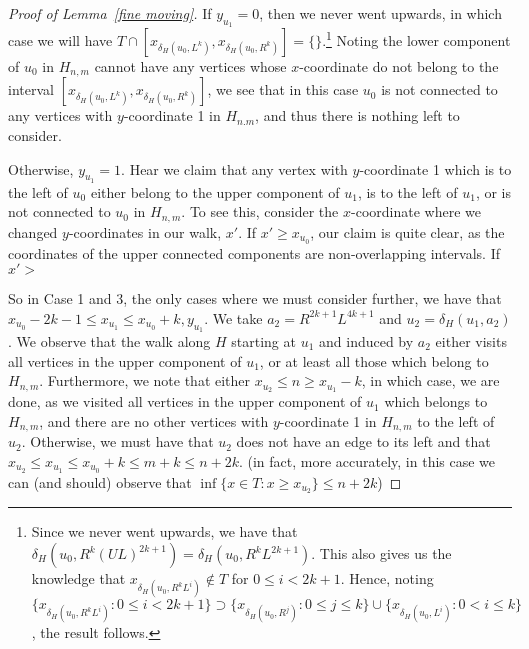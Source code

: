 \documentclass[a4paper]{article}
\theoremstyle{definition}
\newcommand{\hide}[1]{}
\begin{document}
\begin{proof}[Proof of Lemma~\ref*{fine moving}]
    If $y_{u_1} =0$, then we never went upwards, in which case we will have $T\cap [x_{\delta_H(u_0,L^k)},x_{\delta_H(u_0,R^k)}] = \{\}$.\footnote{Since we never went upwards, we have that $\delta_H(u_0,R^k(UL)^{2k+1}) = \delta_H(u_0,R^kL^{2k+1}) $. This also gives us the knowledge that $x_{\delta_H(u_0,R^kL^i)} \not \in T$ for $0\le i < 2k+1$. Hence, noting $\{x_{\delta_H(u_0,R^kL^i)}: 0\le i<2k+1\} \supset \{x_{\delta_H(u_0,R^j)}: 0\le j \le k\}\cup \{x_{\delta_H(u_0,L^i)}: 0< i \le k\}$, the result follows.}\hide{\footnote{Since we never went upwards, we have that $\delta_H(u_0,R^k(UL)^k) = \delta(u_0,R^kL^k)$. This also gives us the knowledge that $x_{\delta_H(u_0,R^kL^i)} \not \in T$ for $0\le i \le k-1$. If $x_{\delta_H(u_0,R^k)}-x_{\delta(u_0,R^kL^k)}<k$ then in the horizontal subgraph of $H$, the connected that $u_0$ belongs to is a path $p$ with less than $k$ edges. It would then follow that the set of $\{\delta(u_0,R^kL^i):0\le i \le k-1\} $ visits each $x$-coordinate of $p$. As each of these $x$-coordinates cannot have a vertical edge, we have that $H=p$ as $H$ is connected. In this case, as $H$ is a horizontal path we clearly have $T=\{\}$. Otherwise, we have $x_{\delta_H(u_0,R^k)}-x_{\delta(u_0,R^kL^k)}=k$ and thus $x_{\delta(u_0,R^kL^i)} = x_{u_1}+k-i$ for $0\le i \le k-1$ and the claim also follows.}} Noting the lower component of $u_0$ in $H_{n,m}$ cannot have any vertices whose $x$-coordinate do not belong to the interval $[x_{\delta_H(u_0,L^k)},x_{\delta_H(u_0,R^k)}]$, we see that in this case $u_0$ is not connected to any vertices with $y$-coordinate 1 in $H_{n.m}$, and thus there is nothing left to consider.
    
    Otherwise, $y_{u_1} = 1$. Hear we claim that any vertex with $y$-coordinate 1 which is to the left of $u_0$ either belong to the upper component of $u_1$, is to the left of $u_1$, or is not connected to $u_0$ in $H_{n,m}$. To see this, consider the $x$-coordinate where we changed $y$-coordinates in our walk, $x'$. If $x' \ge x_{u_0}$, our claim is quite clear, as the coordinates of the upper connected components are non-overlapping intervals. If $x' > $
    
    So in Case 1 and 3, the only cases where we must consider further, we have that $x_{u_0}-2k-1 \le x_{u_1} \le x_{u_0}+k, y_{u_1}$. We take $a_2 = R^{2k+1}L^{4k+1}$ and $u_2 = \delta_H(u_1,a_2)$. We observe that the walk along $H$ starting at $u_1$ and induced by $a_2$ either visits all vertices in the upper component of $u_1$, or at least all those which belong to $H_{n,m}$. Furthermore, we note that either $x_{u_2}\le n\ge x_{u_1}-k$, in which case, we are done, as we visited all vertices in the upper component of $u_1$ which belongs to $H_{n,m}$, and there are no other vertices with $y$-coordinate 1 in $H_{n,m}$ to the left of $u_2$. Otherwise, we must have that $u_2$ does not have an edge to its left and that $x_{u_2} \le x_{u_1}\le x_{u_0}+k\le m+k\le n+2k$. (in fact, more accurately, in this case we can (and should) observe that $\inf\{x\in T: x\ge x_{u_2}\}\le n+2k$)
    

\end{proof}
\end{document}
